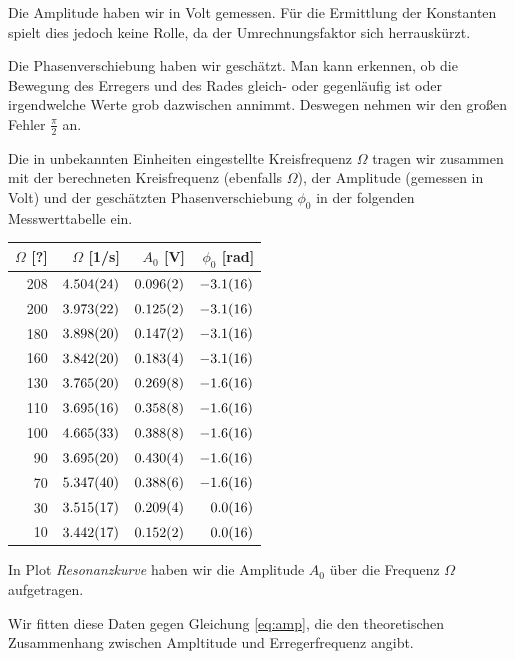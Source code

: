 \documentclass[a4paper,german,12pt,smallheadings]{scrartcl}
\begin{document}
Die Amplitude haben wir in Volt gemessen. Für die Ermittlung der Konstanten
spielt dies jedoch keine Rolle, da der Umrechnungsfaktor sich herrauskürzt.

Die Phasenverschiebung haben wir geschätzt. Man kann erkennen, ob die Bewegung
des Erregers und des Rades gleich- oder gegenläufig ist oder irgendwelche Werte
grob dazwischen annimmt. Deswegen nehmen wir den großen Fehler $\frac{\pi}{2}$ an.

Die in unbekannten Einheiten eingestellte Kreisfrequenz $\Omega$ tragen wir
zusammen mit der berechneten Kreisfrequenz (ebenfalls $\Omega$), der Amplitude
(gemessen in Volt) und der geschätzten Phasenverschiebung $\phi_0$ in der
folgenden Messwerttabelle ein.

\begin{tabular}{r|r|r|r}
  $\Omega$ [?] & $\Omega$ [1/s] & $A_0$ [V] & $\phi_0$ [rad] \\
  \hline
  208 & $\num{4.504+-0.024}$ & $\num{0.096+-0.002}$ & $\num{-3.1+-1.6}$ \\
  200 & $\num{3.973+-0.022}$ & $\num{0.125+-0.002}$ & $\num{-3.1+-1.6}$ \\
  180 & $\num{3.898+-0.020}$ & $\num{0.147+-0.002}$ & $\num{-3.1+-1.6}$ \\
  160 & $\num{3.842+-0.020}$ & $\num{0.183+-0.004}$ & $\num{-3.1+-1.6}$ \\
  130 & $\num{3.765+-0.020}$ & $\num{0.269+-0.008}$ & $\num{-1.6+-1.6}$ \\
  110 & $\num{3.695+-0.016}$ & $\num{0.358+-0.008}$ & $\num{-1.6+-1.6}$ \\
  100 & $\num{4.665+-0.033}$ & $\num{0.388+-0.008}$ & $\num{-1.6+-1.6}$ \\
  90  & $\num{3.695+-0.020}$ & $\num{0.430+-0.004}$ & $\num{-1.6+-1.6}$ \\
  70  & $\num{5.347+-0.040}$ & $\num{0.388+-0.006}$ & $\num{-1.6+-1.6}$ \\
  30  & $\num{3.515+-0.017}$ & $\num{0.209+-0.004}$ & $\num{ 0.0+-1.6}$ \\
  10  & $\num{3.442+-0.017}$ & $\num{0.152+-0.002}$ & $\num{ 0.0+-1.6}$ \\
\end{tabular}

\vspace{1cm}

In Plot \textit{Resonanzkurve} haben wir die Amplitude $A_0$ über die Frequenz
$\Omega$ aufgetragen.

Wir fitten diese Daten gegen Gleichung \ref{eq:amp}, die den theoretischen
Zusammenhang zwischen Ampltitude und Erregerfrequenz angibt.
\end{document}
